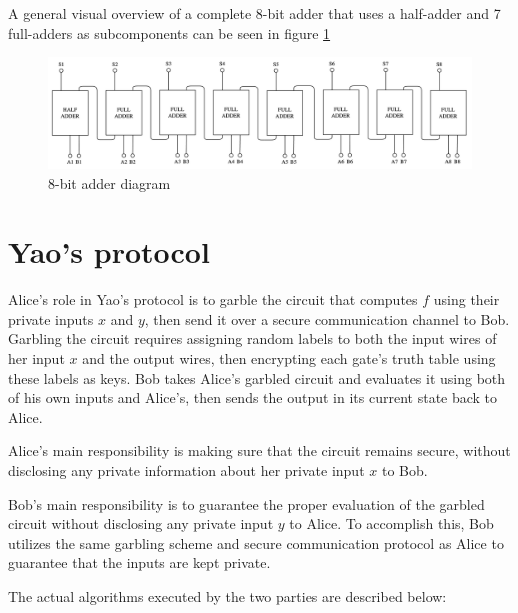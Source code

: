 \documentclass[12pt]{article}
\begin{document}
A general visual overview of a complete 8-bit adder that uses a half-adder and 7 full-adders as subcomponents can be seen in figure \ref{fig:adder} 

\begin{figure}[h]
  \centering
  \includegraphics[width=\textwidth]{adder.png}
  \caption{8-bit adder diagram}\label{fig:adder}
\end{figure}



\section{Yao's protocol}

Alice's role in Yao's protocol \cite{YAO} is to garble the circuit that computes $f$ using their private inputs $x$ and $y$, then send it over a secure communication channel to Bob. Garbling the circuit requires assigning random labels to both the input wires of her input $x$ and the output wires, then encrypting each gate's truth table using these labels as keys. Bob takes Alice's garbled circuit and evaluates it using both of his own inputs and Alice's, then sends the output in its current state back to Alice.

Alice's main responsibility is making sure that the circuit remains secure, without disclosing any private information about her private input $x$ to Bob.

Bob's main responsibility is to guarantee the proper evaluation of the garbled circuit without disclosing any private input $y$ to Alice. To accomplish this, Bob utilizes the same garbling scheme and secure communication protocol as Alice to guarantee that the inputs are kept private.

The actual algorithms executed by the two parties are described below:
\end{document}
